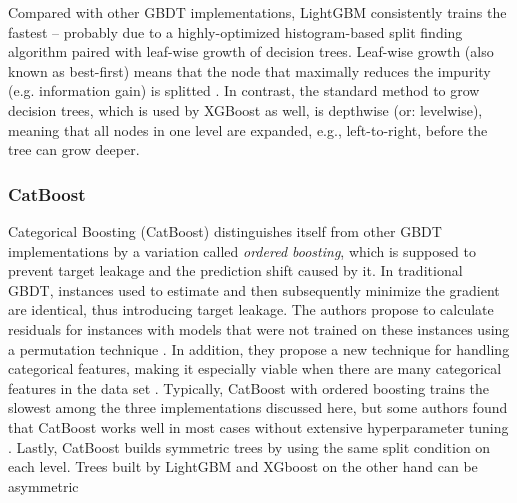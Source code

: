 Compared with other GBDT implementations, LightGBM consistently trains the fastest \parencite[1951--1954]{bentejac_comparative_2021} -- probably due to a highly-optimized histogram-based split finding algorithm paired with leaf-wise growth of decision trees. Leaf-wise growth (also known as best-first) means that the node that maximally reduces the impurity (e.g. information gain) is splitted \parencite[3]{shi_best-first_2007}. In contrast, the standard method to grow decision trees, which is used by XGBoost as well, is depthwise (or: levelwise), meaning that all nodes in one level are expanded, e.g., left-to-right, before the tree can grow deeper. 

\subsubsection{CatBoost}

Categorical Boosting (CatBoost) distinguishes itself from other GBDT implementations by a variation called \textit{ordered boosting}, which is supposed to prevent target leakage and the prediction shift caused by it. In traditional GBDT, instances used to estimate and then subsequently minimize the gradient are identical, thus introducing target leakage. The authors propose to calculate residuals for instances with models that were not trained on these instances using a permutation technique \parencites[5]{prokhorenkova_catboost_2017}[1943--1944]{bentejac_comparative_2021}. In addition, they propose a new technique for handling categorical features, making it especially viable when there are many categorical features in the data set \parencite[1]{prokhorenkova_catboost_2017}. Typically, CatBoost with ordered boosting trains the slowest among the three implementations discussed here, but some authors found that CatBoost works well in most cases without extensive hyperparameter tuning \parencite[26]{florek_benchmarking_2023}. Lastly, CatBoost builds symmetric trees by using the same split condition on each level. Trees built by LightGBM and XGboost on the other hand can be asymmetric \parencite[8]{florek_benchmarking_2023}

